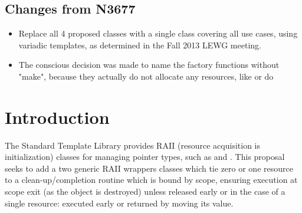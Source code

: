 \documentclass[ebook,11pt,article]{memoir}
\begin{document}
\section{Changes from N3677}
\begin{itemize}
\item Replace all 4 proposed classes with a single class covering all use cases, using variadic templates, as determined in the Fall 2013 LEWG meeting.
\item The conscious decision was made to name the factory functions without "make", because they actually do not allocate any resources, like  or  do
\end{itemize}

\chapter{Introduction}
The Standard Template Library provides RAII (resource acquisition is initialization) classes for managing pointer types, such as  and .  This proposal seeks to add a two generic RAII wrappers classes which tie zero or one resource to a clean-up/completion routine which is bound by scope, ensuring execution at scope exit (as the object is destroyed) unless released early or in the case of a single resource: executed early or returned by moving its value.
\end{document}
